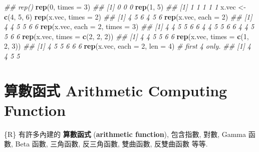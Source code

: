 \documentclass[
]{book}
\newenvironment{Shaded}{\begin{snugshade}}{\end{snugshade}}
\newcommand{\CommentTok}[1]{\textcolor[rgb]{0.56,0.35,0.01}{\textit{#1}}}
\newcommand{\DataTypeTok}[1]{\textcolor[rgb]{0.13,0.29,0.53}{#1}}
\newcommand{\DecValTok}[1]{\textcolor[rgb]{0.00,0.00,0.81}{#1}}
\newcommand{\KeywordTok}[1]{\textcolor[rgb]{0.13,0.29,0.53}{\textbf{#1}}}
\newcommand{\NormalTok}[1]{#1}
\newcommand{\StringTok}[1]{\textcolor[rgb]{0.31,0.60,0.02}{#1}}
\begin{document}
\begin{Shaded}
\begin{Highlighting}[]
\CommentTok{\#\# rep()}
\KeywordTok{rep}\NormalTok{(}\DecValTok{0}\NormalTok{, }\DataTypeTok{times =} \DecValTok{3}\NormalTok{)}
\CommentTok{\#\# [1] 0 0 0}
\KeywordTok{rep}\NormalTok{(}\DecValTok{1}\NormalTok{, }\DecValTok{5}\NormalTok{)}
\CommentTok{\#\# [1] 1 1 1 1 1}
\NormalTok{x.vec \textless{}{-}}\StringTok{ }\KeywordTok{c}\NormalTok{(}\DecValTok{4}\NormalTok{, }\DecValTok{5}\NormalTok{, }\DecValTok{6}\NormalTok{)}
\KeywordTok{rep}\NormalTok{(x.vec, }\DataTypeTok{times =} \DecValTok{2}\NormalTok{)}
\CommentTok{\#\# [1] 4 5 6 4 5 6}
\KeywordTok{rep}\NormalTok{(x.vec, }\DataTypeTok{each =} \DecValTok{2}\NormalTok{)}
\CommentTok{\#\# [1] 4 4 5 5 6 6}
\KeywordTok{rep}\NormalTok{(x.vec, }\DataTypeTok{each =} \DecValTok{2}\NormalTok{, }\DataTypeTok{times =} \DecValTok{3}\NormalTok{)}
\CommentTok{\#\#  [1] 4 4 5 5 6 6 4 4 5 5 6 6 4 4 5 5 6 6}
\KeywordTok{rep}\NormalTok{(x.vec, }\DataTypeTok{times =} \KeywordTok{c}\NormalTok{(}\DecValTok{2}\NormalTok{, }\DecValTok{2}\NormalTok{, }\DecValTok{2}\NormalTok{))}
\CommentTok{\#\# [1] 4 4 5 5 6 6}
\KeywordTok{rep}\NormalTok{(x.vec, }\DataTypeTok{times =} \KeywordTok{c}\NormalTok{(}\DecValTok{1}\NormalTok{, }\DecValTok{2}\NormalTok{, }\DecValTok{3}\NormalTok{))}
\CommentTok{\#\# [1] 4 5 5 6 6 6}
\KeywordTok{rep}\NormalTok{(x.vec, }\DataTypeTok{each =} \DecValTok{2}\NormalTok{, }\DataTypeTok{len =} \DecValTok{4}\NormalTok{)    }\CommentTok{\# first 4 only.}
\CommentTok{\#\# [1] 4 4 5 5}
\end{Highlighting}
\end{Shaded}

\hypertarget{ux7b97ux6578ux51fdux5f0f-arithmetic-computing-function}{%
\section{算數函式 Arithmetic Computing Function}\label{ux7b97ux6578ux51fdux5f0f-arithmetic-computing-function}}

\{R\} 有許多內建的
\textbf{算數函式}
(\textbf{arithmetic function}),
包含指數, 對數,
Gamma 函數, Beta 函數,
三角函數, 反三角函數,
雙曲函數, 反雙曲函數 等等.
\end{document}
